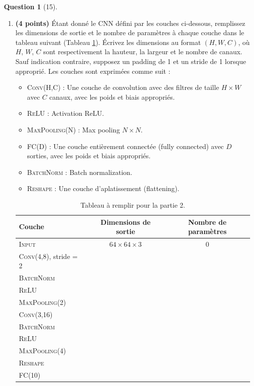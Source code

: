 \documentclass[12pt]{article}
\theoremstyle{definition}
\newtheorem{exercise}{Question}%
\begin{document}
\begin{exercise}[15]
{\begin{enumerate}
\item \textbf{(4 points)} Étant donné le CNN défini par les couches ci-dessous, remplissez les dimensions de sortie et le nombre de paramètres à chaque couche dans le tableau suivant (Tableau \ref{tab:cnn-table}). Écrivez les dimensions au format $(H, W, C)$, où $H$, $W$, $C$ sont respectivement la hauteur, la largeur et le nombre de canaux. Sauf indication contraire, supposez un padding de 1 et un stride de 1 lorsque approprié. Les couches sont exprimées comme suit :
\begin{itemize}
    \item \textsc{Conv(H,C)} : Une couche de convolution avec des filtres de taille $H\times W$ avec $C$ canaux, avec les poids et biais appropriés.
    \item \textsc{ReLU} : Activation ReLU.
    \item \textsc{MaxPooling(N)} : Max pooling $N\times N$.
    \item \textsc{FC(D)} : Une couche entièrement connectée (fully connected) avec $D$ sorties, avec les poids et biais appropriés.
    \item \textsc{BatchNorm} : Batch normalization.
    \item \textsc{Reshape} : Une couche d'aplatissement (flattening).
\end{itemize}
\begin{table}[h]
    \centering
    \begin{tabular}{l|c|c}
    \toprule
    Couche & Dimensions de sortie & Nombre de paramètres \\
    \midrule
    \textsc{Input} & $64\times 64 \times 3$ & $0$\\
    \textsc{Conv(4,8)}, stride = 2 & & \\
    \textsc{BatchNorm} & & \\
    \textsc{ReLU} & & \\
    \textsc{MaxPooling(2)} & & \\
    \textsc{Conv(3,16)} & & \\
    \textsc{BatchNorm} & & \\
    \textsc{ReLU} & & \\
    \textsc{MaxPooling(4)} & & \\
    \textsc{Reshape} & & \\
    \textsc{FC(10)} & & \\
    \bottomrule
    \end{tabular}
    \caption{Tableau à remplir pour la partie 2.}
    \label{tab:cnn-table}
\end{table}


\end{enumerate}}
\end{exercise}
\end{document}
